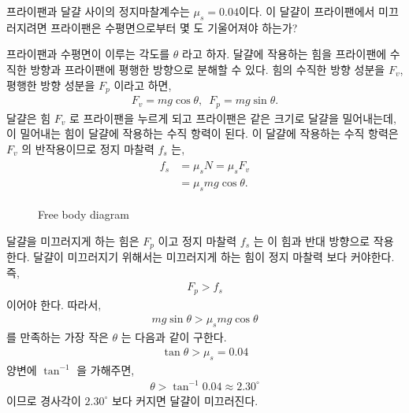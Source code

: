 \documentclass[floatfix,nofootinbib,superscriptaddress,fleqn,preprint]{revtex4}
\begin{document}
\vspace{2cm}

 프라이팬과 달걀 사이의 정지마찰계수는
$\mu_s=0.04$이다. 이 달걀이 프라이팬에서 미끄러지려면 프라이팬은
수평면으로부터 몇 도 기울어져야 하는가?  \\



프라이팬과 수평면이 이루는 각도를 $\theta$ 라고 하자. 달걀에 작용하는 힘을
프라이팬에 수직한 방향과 프라이팬에 평행한 방향으로 분해할 수 있다. 힘의 수직한
방향 성분을 $F_v$, 평행한 방향 성분을 $F_p$ 이라고 하면,
\begin{align}
F_v = mg\cos{\theta},\,\,\,F_p = mg\sin{\theta}  .
\end{align}
달걀은 힘 $F_v$ 로 프라이팬을 누르게 되고 프라이팬은 같은 크기로 달걀을 밀어내는데,
이 밀어내는 힘이 달걀에 작용하는 수직 항력이 된다.
이 달걀에 작용하는 수직 항력은 $F_v$ 의 반작용이므로 정지 마찰력 $f_s$ 는,
\begin{align}
  \begin{split}
    f_s &= \mu_s N = \mu_s F_v \\
    &= \mu_s mg\cos{\theta}.
  \end{split}
\end{align} 

\begin{figure}
   \caption{Free body diagram}
\end{figure}

달걀을 미끄러지게 하는 힘은 $F_p$ 이고 정지 마찰력 $f_s$ 는 이 힘과 반대 방향으로
작용한다. 달걀이 미끄러지기 위해서는 미끄러지게 하는 힘이 정지 마찰력 보다 커야한다. 즉,
\begin{align}
  F_p > f_s
\end{align}
이어야 한다. 따라서,
\begin{align}
  mg\sin{\theta}  > \mu_s mg\cos{\theta}
\end{align}
를 만족하는 가장 작은 $\theta$ 는 다음과 같이 구한다.
\begin{align}
  \tan{\theta} > \mu_s = 0.04
\end{align}
양변에 $\tan^{-1}$ 을 가해주면,
  \begin{align}
  \theta > \tan^{-1}{0.04} \approx 2.30^\circ
\end{align}
이므로 경사각이 $2.30^\circ$ 보다 커지면 달걀이 미끄러진다.
\vspace{2cm}
\end{document}
